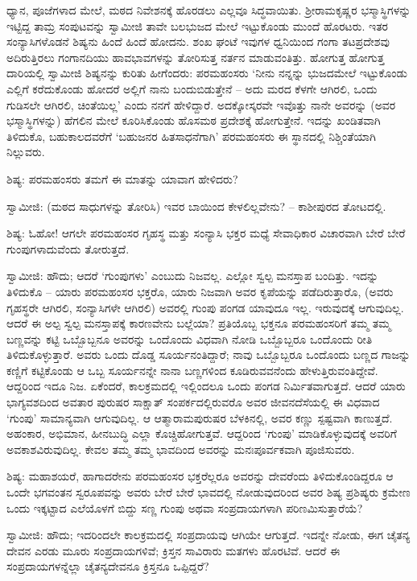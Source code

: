 ಧ್ಯಾನ, ಪೂಜೆಗಳಾದ ಮೇಲೆ, ಮಠದ ನಿವೇಶನಕ್ಕೆ ಹೊರಡಲು ಎಲ್ಲವೂ ಸಿದ್ಧವಾಯಿತು. ಶ‍್ರೀರಾಮಕೃಷ್ಣರ ಭಸ್ಮಾಸ್ಥಿಗಳನ್ನು ಇಟ್ಟಿದ್ದ ತಾಮ್ರ ಸಂಪುಟವನ್ನು ಸ್ವಾಮೀಜಿ ತಾವೇ ಬಲಭುಜದ ಮೇಲೆ ಇಟ್ಟುಕೊಂಡು ಮುಂದೆ ಹೊರಟರು. ಇತರ ಸಂನ್ಯಾಸಿಗಳೊಡನೆ ಶಿಷ್ಯನು ಹಿಂದೆ ಹಿಂದೆ ಹೋದನು. ಶಂಖ ಘಂಟೆ ಇವುಗಳ ಧ್ವನಿಯಿಂದ ಗಂಗಾ ತಟಪ್ರದೇಶವು ಅದಿರುತ್ತಿರಲು ಗಂಗಾನದಿಯು ಹಾವಭಾವಗಳನ್ನು ತೋರಿಸುತ್ತ ನರ್ತನ ಮಾಡುವಂತಿತ್ತು. ಹೋಗುತ್ತ ಹೋಗುತ್ತ ದಾರಿಯಲ್ಲಿ ಸ್ವಾಮೀಜಿ ಶಿಷ್ಯನನ್ನು ಕುರಿತು ಹೀಗೆಂದರು: ಪರಮಹಂಸರು ‘ನೀನು ನನ್ನನ್ನು ಭುಜದಮೇಲೆ ಇಟ್ಟುಕೊಂಡು ಎಲ್ಲಿಗೆ ಕರೆದುಕೊಂಡು ಹೋದರೆ ಅಲ್ಲಿಗೆ ನಾನು ಬಂದುಬಿಡುತ್ತೇನೆ – ಅದು ಮರದ ಕೆಳಗೇ ಆಗಿರಲಿ, ಒಂದು ಗುಡಿಸಲೇ ಆಗಿರಲಿ, ಚಿಂತೆಯಿಲ್ಲ’ ಎಂದು ನನಗೆ ಹೇಳಿದ್ದಾರೆ. ಅದಕ್ಕೋಸ್ಕರವೇ ಇವೊತ್ತು ನಾನೇ ಅವರನ್ನು (ಅವರ ಭಸ್ಮಾಸ್ಥಿಗಳನ್ನು) ಹೆಗಲಿನ ಮೇಲೆ ಕೂರಿಸಿಕೊಂಡು ಹೊಸಮಠ ಪ್ರದೇಶಕ್ಕೆ ಹೋಗುತ್ತೇನೆ. ಇದನ್ನು ಖಂಡಿತವಾಗಿ ತಿಳಿದುಕೊ, ಬಹುಕಾಲದವರೆಗೆ ‘ಬಹುಜನರ ಹಿತಸಾಧನೆಗಾಗಿ’ ಪರಮಹಂಸರು ಈ ಸ್ಥಾನದಲ್ಲಿ ನಿಶ್ಚಿಂತೆಯಾಗಿ ನಿಲ್ಲುವರು.

ಶಿಷ್ಯ: ಪರಮಹಂಸರು ತಮಗೆ ಈ ಮಾತನ್ನು ಯಾವಾಗ ಹೇಳಿದರು?

ಸ್ವಾಮೀಜಿ: (ಮಠದ ಸಾಧುಗಳನ್ನು ತೋರಿಸಿ) ಇವರ ಬಾಯಿಂದ ಕೇಳಲಿಲ್ಲವೇನು? – ಕಾಶೀಪುರದ ತೋಟದಲ್ಲಿ.

ಶಿಷ್ಯ: ಓಹೋ! ಆಗಲೇ ಪರಮಹಂಸರ ಗೃಹಸ್ಥ ಮತ್ತು ಸಂನ್ಯಾಸಿ ಭಕ್ತರ ಮಧ್ಯೆ ಸೇವಾಧಿಕಾರ ವಿಚಾರವಾಗಿ ಬೇರೆ ಬೇರೆ ಗುಂಪುಗಳಾದುವೆಂದು ತೋರುತ್ತದೆ.

ಸ್ವಾಮೀಜಿ: ಹೌದು; ಆದರೆ ‘ಗುಂಪುಗಳು’ ಎಂಬುದು ನಿಜವಲ್ಲ. ಎಲ್ಲೋ ಸ್ವಲ್ಪ ಮನಸ್ತಾಪ ಬಂದಿತ್ತು. ಇದನ್ನು ತಿಳಿದುಕೊ – ಯಾರು ಪರಮಹಂಸರ ಭಕ್ತರೊ, ಯಾರು ನಿಜವಾಗಿ ಅವರ ಕೃಪೆಯನ್ನು ಪಡೆದಿರುತ್ತಾರೊ, (ಅವರು ಗೃಹಸ್ಥರೇ ಆಗಿರಲಿ, ಸಂನ್ಯಾಸಿಗಳೇ ಆಗಿರಲಿ) ಅವರಲ್ಲಿ ಗುಂಪು ಪಂಗಡ ಯಾವುದೂ ಇಲ್ಲ. ಇರುವುದಕ್ಕೆ ಆಗುವುದಿಲ್ಲ. ಆದರೆ ಈ ಅಲ್ಪ ಸ್ವಲ್ಪ ಮನಸ್ತಾಪಕ್ಕೆ ಕಾರಣವೇನು ಬಲ್ಲೆಯಾ? ಪ್ರತಿಯೊಬ್ಬ ಭಕ್ತನೂ ಪರಮಹಂಸರಿಗೆ ತಮ್ಮ ತಮ್ಮ ಬಣ್ಣವನ್ನು ಕಟ್ಟಿ ಒಬ್ಬೊಬ್ಬನೂ ಅವರನ್ನು ಒಂದೊಂದು ವಿಧವಾಗಿ ನೋಡಿ ಒಬ್ಬೊಬ್ಬರೂ ಒಂದೊಂದು ರೀತಿ ತಿಳಿದುಕೊಳ್ಳುತ್ತಾರೆ. ಅವರು ಒಂದು ದೊಡ್ಡ ಸೂರ್ಯನಂತಿದ್ದಾರೆ; ನಾವು ಒಬ್ಬೊಬ್ಬರೂ ಒಂದೊಂದು ಬಣ್ಣದ ಗಾಜನ್ನು ಕಣ್ಣಿಗೆ ಕಟ್ಟಿಕೊಂಡು ಆ ಒಬ್ಬ ಸೂರ್ಯನನ್ನೇ ನಾನಾ ಬಣ್ಣಗಳಿಂದ ಕೂಡಿರುವವನೆಂದು ಹೇಳುತ್ತಿರುವಂತಿದ್ದೇವೆ. ಆದ್ದರಿಂದ ಇದೂ ನಿಜ. ಏಕೆಂದರೆ, ಕಾಲಕ್ರಮದಲ್ಲಿ ಇಲ್ಲಿಂದಲೂ ಒಂದು ಪಂಗಡ ನಿರ್ಮಿತವಾಗುತ್ತದೆ. ಆದರೆ ಯಾರು ಭಾಗ್ಯವಶದಿಂದ ಅವತಾರ ಪುರುಷರ ಸಾಕ್ಷಾತ್ ಸಂಪರ್ಕದಲ್ಲಿರುವರೊ ಅವರ ಜೀವನದೆಸೆಯಲ್ಲಿ ಈ ವಿಧವಾದ ‘ಗುಂಪು’ ಸಾಮಾನ್ಯವಾಗಿ ಆಗುವುದಿಲ್ಲ. ಆ ಆತ್ಮಾರಾಮಪುರುಷರ ಬೆಳಕಿನಲ್ಲಿ, ಅವರ ಕಣ್ಣು ಸ್ಪಷ್ಟವಾಗಿ ಕಾಣುತ್ತದೆ. ಅಹಂಕಾರ, ಅಭಿಮಾನ, ಹೀನಬುದ್ಧಿ ಎಲ್ಲಾ ಕೊಚ್ಚಿಹೋಗುತ್ತವೆ. ಆದ್ದರಿಂದ ‘ಗುಂಪು’ ಮಾಡಿಕೊಳ್ಳುವುದಕ್ಕೆ ಅವರಿಗೆ ಅವಕಾಶವಿರುವುದಿಲ್ಲ. ಕೇವಲ ತಮ್ಮ ತಮ್ಮ ಭಾವದಿಂದ ಅವರನ್ನು ಮನಃಪೂರ್ವಕವಾಗಿ ಪೂಜಿಸುವರು.

ಶಿಷ್ಯ: ಮಹಾಶಯರೆ, ಹಾಗಾದರೇನು ಪರಮಹಂಸರ ಭಕ್ತರೆಲ್ಲರೂ ಅವರನ್ನು ದೇವರೆಂದು ತಿಳಿದುಕೊಂಡಿದ್ದರೂ ಆ ಒಂದೇ ಭಗವಂತನ ಸ್ವರೂಪವನ್ನು ಅವರು ಬೇರೆ ಬೇರೆ ಭಾವದಲ್ಲಿ ನೋಡುವುದರಿಂದ ಅವರ ಶಿಷ್ಯ ಪ್ರಶಿಷ್ಯರು ಕ್ರಮೇಣ ಒಂದು ಇಕ್ಕಟ್ಟಾದ ಎಲೆಯೊಳಗೆ ಬಿದ್ದು ಸಣ್ಣ ಗುಂಪು ಅಥವಾ ಸಂಪ್ರದಾಯಗಳಾಗಿ ಪರಿಣಮಿಸುತ್ತಾರೆಯೆ?

ಸ್ವಾಮೀಜಿ: ಹೌದು; ಇದರಿಂದಲೇ ಕಾಲಕ್ರಮದಲ್ಲಿ ಸಂಪ್ರದಾಯವು ಆಗಿಯೇ ಆಗುತ್ತದೆ. ಇದನ್ನೇ ನೋಡು, ಈಗ ಚೈತನ್ಯ ದೇವನ ಎರಡು ಮೂರು ಸಂಪ್ರದಾಯಗಳಿವೆ; ಕ್ರಿಸ್ತನ ಸಾವಿರಾರು ಮತಗಳು ಹೊರಟಿವೆ. ಆದರೆ ಈ ಸಂಪ್ರದಾಯಗಳನ್ನೆಲ್ಲಾ ಚೈತನ್ಯದೇವನೂ ಕ್ರಿಸ್ತನೂ ಒಪ್ಪಿದ್ದರೆ?

